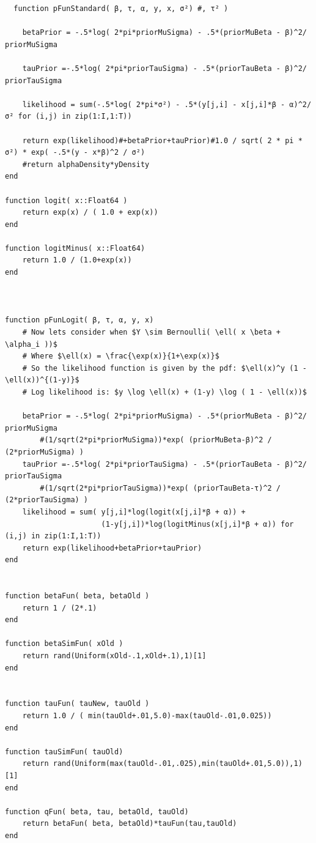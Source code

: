 \documentclass[12pt]{paper}
\begin{document}
\begin{verbatim}
  function pFunStandard( β, τ, α, y, x, σ²) #, τ² )
    
    betaPrior = -.5*log( 2*pi*priorMuSigma) - .5*(priorMuBeta - β)^2/ priorMuSigma
        
    tauPrior =-.5*log( 2*pi*priorTauSigma) - .5*(priorTauBeta - β)^2/ priorTauSigma
        
    likelihood = sum(-.5*log( 2*pi*σ²) - .5*(y[j,i] - x[j,i]*β - α)^2/ σ² for (i,j) in zip(1:I,1:T)) 
    
    return exp(likelihood)#+betaPrior+tauPrior)#1.0 / sqrt( 2 * pi * σ²) * exp( -.5*(y - x*β)^2 / σ²)
    #return alphaDensity*yDensity
end

function logit( x::Float64 )
    return exp(x) / ( 1.0 + exp(x))
end

function logitMinus( x::Float64)
    return 1.0 / (1.0+exp(x))
end



function pFunLogit( β, τ, α, y, x)
    # Now lets consider when $Y \sim Bernoulli( \ell( x \beta + \alpha_i ))$
    # Where $\ell(x) = \frac{\exp(x)}{1+\exp(x)}$
    # So the likelihood function is given by the pdf: $\ell(x)^y (1 - \ell(x))^{(1-y)}$
    # Log likelihood is: $y \log \ell(x) + (1-y) \log ( 1 - \ell(x))$

    betaPrior = -.5*log( 2*pi*priorMuSigma) - .5*(priorMuBeta - β)^2/ priorMuSigma
        #(1/sqrt(2*pi*priorMuSigma))*exp( (priorMuBeta-β)^2 / (2*priorMuSigma) )
    tauPrior =-.5*log( 2*pi*priorTauSigma) - .5*(priorTauBeta - β)^2/ priorTauSigma
        #(1/sqrt(2*pi*priorTauSigma))*exp( (priorTauBeta-τ)^2 / (2*priorTauSigma) )
    likelihood = sum( y[j,i]*log(logit(x[j,i]*β + α)) +
                      (1-y[j,i])*log(logitMinus(x[j,i]*β + α)) for (i,j) in zip(1:I,1:T))
    return exp(likelihood+betaPrior+tauPrior)
end


function betaFun( beta, betaOld )
    return 1 / (2*.1)
end

function betaSimFun( xOld )
    return rand(Uniform(xOld-.1,xOld+.1),1)[1]
end


function tauFun( tauNew, tauOld )
    return 1.0 / ( min(tauOld+.01,5.0)-max(tauOld-.01,0.025))
end

function tauSimFun( tauOld)
    return rand(Uniform(max(tauOld-.01,.025),min(tauOld+.01,5.0)),1)[1]
end

function qFun( beta, tau, betaOld, tauOld)
    return betaFun( beta, betaOld)*tauFun(tau,tauOld)
end
\end{verbatim}
\end{document}
